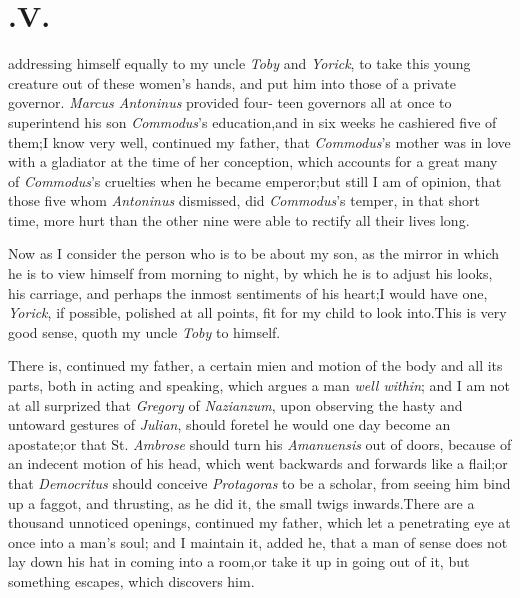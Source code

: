\documentclass{article}
\begin{document}
\etp

\section{.\enspace V.}

\vskip -6pt

 \break
addressing himself equally to my uncle \textit{Toby} and
\textit{Yorick}, to take this young creature out of these
women’s hands, and put him into those of a private governor.
\textit{Marcus Antoninus} provided four- teen governors all at once to
superintend his son \textit{Commodus}’s education,\tsk and in
six weeks he cashiered five of them;\tsk \break I know very well,
continued my father, that \textit{Commodus}’s mother was in
love with a gladiator at the time of her conception, which accounts
for a great many of \textit{Commodus}’s cruelties when he
became emperor;\tsk but still I am of opinion, that those five
whom \textit{Antoninus} dismissed, did \textit{Commodus}’s
temper, in that short time, more hurt than the other nine were able
to rectify all their lives long.

Now as I consider the person who is to be about my son, as the
mirror in which he is to view himself from morning to night,
by which he is to adjust his looks, his carriage, and perhaps the
inmost sentiments of his heart;\tsk I would have one,
\textit{Yorick}, if possible, polished at all points, fit for my
child to look into.\break\tsh This is very good sense, quoth my
uncle \textit{Toby} to himself.

\tsh There is, continued my father,\break
a certain mien and motion of the body\break
and all its parts, both in acting and\break
speaking, which argues a man \textit{well\break
within}; and I am not at all surprized\break
that \textit{Gregory} of \textit{Nazianzum}, upon ob\-serving
the hasty and untoward gestures of \textit{Julian}, should foretel he
would one day become an apostate;\tsh or that St.\break
\textit{Ambrose} should turn his \textit{Amanuensis} out of doors,
because of an indecent motion of his head, which went backwards and
forwards like a flail;\tsh or that \textit{Democritus}
should conceive \textit{Protagoras} to be a scholar, from seeing him
bind up a faggot, and thrusting, as he did it,\break
the small twigs inwards.\tsh There are a thousand unnoticed openings,
continued my father, which let a penetrating eye at once into
a man’s soul; and I maintain it, added he, that a man of
sense does not lay down his hat in coming into a room,\tsk or
take it up in going out of it, but something escapes, which
discovers him.
\end{document}
